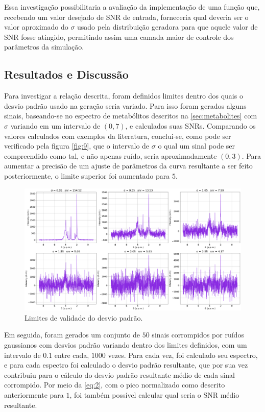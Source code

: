 \documentclass{article}
\begin{document}
Essa investigação possibilitaria a avaliação da implementação de uma função que, recebendo um valor desejado de SNR de entrada, forneceria qual deveria ser o valor aproximado do $\sigma$ usado pela distribuição 
geradora para que aquele valor de SNR fosse atingido, permitindo assim uma camada maior de controle dos parâmetros da simulação.

\subsection{Resultados e Discussão}

Para investigar a relação descrita, foram definidos limites dentro dos quais o desvio padrão usado na geração seria variado. Para isso foram gerados alguns sinais, baseando-se no espectro de metabólitos descritos na \autoref{sec:metabolites} com $\sigma$ variando em um intervalo de $(0, 7)$, e calculados suas SNRs.
Comparando os valores calculados com exemplos da literatura, conclui-se, como pode ser verificado pela figura \autoref{fig:9}, que o intervalo de $\sigma$ o qual um sinal pode ser compreendido como tal, e não apenas ruído, seria aproximadamente $(0, 3)$. Para aumentar a precisão de um ajuste de parâmetros da 
curva resultante a ser feito posteriormente, o limite superior foi aumentado para $5$.

\begin{figure}[H]
    \includegraphics[scale=0.22]{snr_limits.png}
    \centering
    \caption{Limites de validade do desvio padrão.}
    \label{fig:9}
\end{figure}

Em seguida, foram gerados um conjunto de $50$ sinais corrompidos por ruídos gaussianos com desvios padrão variando dentro dos limites definidos, com um intervalo de $0.1$ entre cada, $1000$ vezes. Para cada vez, foi calculado seu espectro, e para cada espectro foi calculado o desvio padrão resultante, que por sua vez contribuiu para o cálculo do desvio padrão 
resultante médio de cada sinal corrompido. Por meio da \autoref{eq:2}, com o pico normalizado como descrito anteriormente para $1$, foi também possível calcular qual seria o SNR médio resultante.
\end{document}
